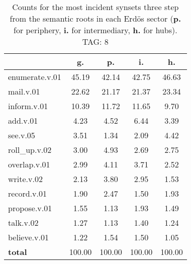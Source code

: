 \begin{table}[h!]
\begin{center}
\begin{tabular}{| l | c | c | c | c |}\hline
 & g. & p. & i. & h. \\\hline
enumerate.v.01 & 45.19  & 42.14  & 42.75  & 46.63 \\\hline
mail.v.01 & 22.62  & 21.17  & 21.37  & 23.34 \\\hline
inform.v.01 & 10.39  & 11.72  & 11.65  & 9.70 \\\hline
add.v.01 & 4.23  & 4.52  & 6.44  & 3.39 \\\hline
see.v.05 & 3.51  & 1.34  & 2.09  & 4.42 \\\hline
roll\_up.v.02 & 3.00  & 4.93  & 2.69  & 2.75 \\\hline
overlap.v.01 & 2.99  & 4.11  & 3.71  & 2.52 \\\hline
write.v.02 & 2.13  & 3.80  & 2.95  & 1.53 \\\hline
record.v.01 & 1.90  & 2.47  & 1.50  & 1.93 \\\hline
propose.v.01 & 1.55  & 1.13  & 1.93  & 1.49 \\\hline
talk.v.02 & 1.27  & 1.13  & 1.40  & 1.24 \\\hline
believe.v.01 & 1.22  & 1.54  & 1.50  & 1.05 \\\hline
{{\bf total}} & 100.00  & 100.00  & 100.00  & 100.00 \\\hline
\end{tabular}
\caption{Counts for the most incident synsets three step from the semantic roots in each Erd\"os sector ({\bf p.} for periphery, {\bf i.} for intermediary, {\bf h.} for hubs). TAG: 8}
\end{center}
\end{table}